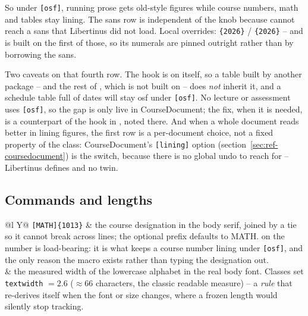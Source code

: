 So under \texttt{[osf]}, running prose gets old-style figures while course
numbers, math and tables stay lining. The sans row is independent of the
knob because  cannot reach a sans that Libertinus did not load.
Local overrides: \texttt{\{2026\}} /
\texttt{\{2026\}} -- and  is built on the first
of those, so its numerals are pinned outright rather than by borrowing the
sans.

Two caveats on that fourth row. The hook is on  itself, so a
table built by another package --  and the rest of
, which is not built on  -- does \emph{not}
inherit it, and a schedule table full of dates will stay osf under
\texttt{[osf]}. No lecture or assessment uses \texttt{[osf]}, so the gap is
only live in CourseDocument; the fix, when it is needed, is a 
counterpart of the hook in , noted there. And when a whole document reads better in lining figures,
the first row is a per-document choice, not a fixed property of the class:
CourseDocument's \texttt{[lining]} option
(section~\ref{sec:ref-coursedocument}) is the switch, because there is no
global undo to reach for -- Libertinus defines  and no
 twin.

\subsection*{Commands and lengths}

\begin{center}
\begin{tabularx}{\linewidth}{@{}l Y@{}}
\texttt{[MATH]\{1013\}} & the course designation in the body
  serif, joined by a tie so it cannot break across lines; the optional
  prefix defaults to MATH.  on the number is load-bearing:
  it is what keeps a course number lining under \texttt{[osf]}, and the
  only reason the macro exists rather than typing the designation out.\\
 & the measured width of the lowercase alphabet in the real
  body font. Classes set \texttt{textwidth} $= 2.6$ ($\approx
  66$ characters, the classic readable measure) -- a \emph{rule} that
  re-derives itself when the font or size changes, where a frozen length
  would silently stop tracking.\\
\end{tabularx}
\end{center}
